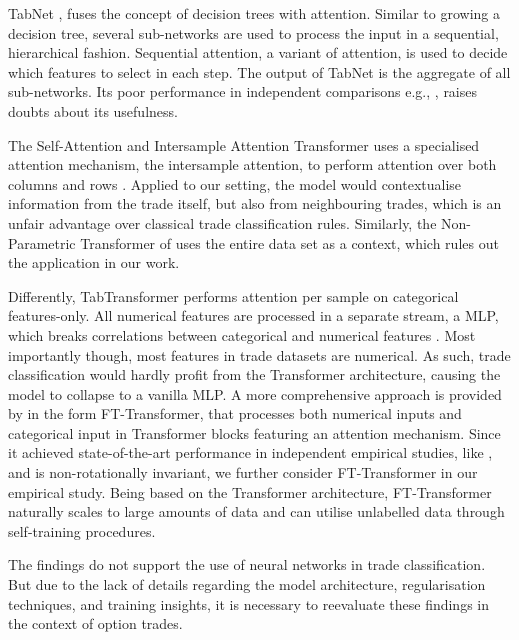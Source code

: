 TabNet \autocite[][3--5]{arikTabnetAttentiveInterpretable2020}, fuses the concept of decision trees with attention. Similar to growing a decision tree, several sub-networks are used to process the input in a sequential, hierarchical fashion. Sequential attention, a variant of attention, is used to decide which features to select in each step. The output of TabNet is the aggregate of all sub-networks. Its poor performance in independent comparisons e.g., \textcites[][7]{kadraWelltunedSimpleNets2021}[][7]{gorishniyRevisitingDeepLearning2021}, raises doubts about its usefulness.

The Self-Attention and Intersample Attention Transformer uses a specialised attention mechanism, the intersample attention, to perform attention over both columns and rows \autocite[][4--5]{somepalliSaintImprovedNeural2021}. Applied to our setting, the model would contextualise information from the trade itself, but also from neighbouring trades, which is an unfair advantage over classical trade classification rules. Similarly, the Non-Parametric Transformer of \textcite[][3--4]{kossenSelfAttentionDatapointsGoing2021} uses the entire data set as a context, which rules out the application in our work.

Differently, TabTransformer \autocite[][2--3]{huangTabTransformerTabularData2020} performs attention per sample on categorical features-only. All numerical features are processed in a separate stream, a \gls{MLP}, which breaks correlations between categorical and numerical features \autocite[][2]{somepalliSaintImprovedNeural2021}. Most importantly though, most features in trade datasets are numerical. As such, trade classification would hardly profit from the Transformer architecture, causing the model to collapse to a vanilla \gls{MLP}. A more comprehensive approach is provided by \textcite[][4--5]{gorishniyRevisitingDeepLearning2021} in the form FT-Transformer, that processes both numerical inputs and categorical input in Transformer blocks featuring an attention mechanism. Since it achieved state-of-the-art performance in independent empirical studies, like \textcite[][5]{grinsztajnWhyTreebasedModels2022}, and is non-rotationally invariant, we further consider FT-Transformer in our empirical study. Being based on the Transformer architecture, FT-Transformer naturally scales to large amounts of data and can utilise unlabelled data through self-training procedures.

The findings \textcite[][50]{ronenMachineLearningTrade2022} do not support the use of neural networks in trade classification. But due to the lack of details regarding the model architecture, regularisation techniques, and training insights, it is necessary to reevaluate these findings in the context of option trades.

